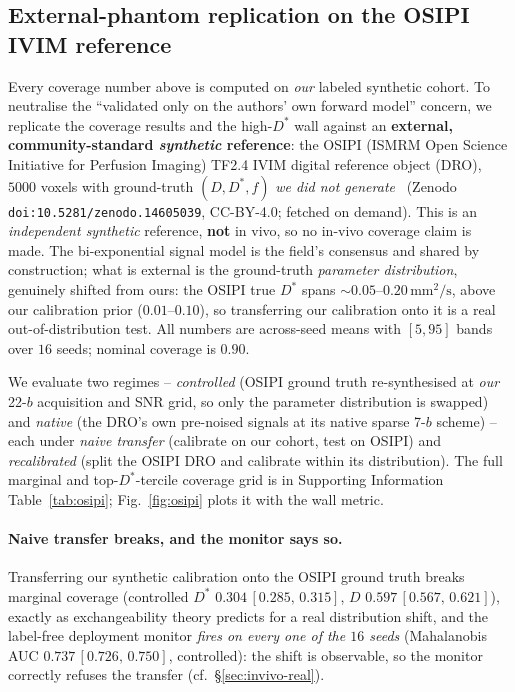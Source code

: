 \documentclass[11pt]{article}
\newcommand{\Dstar}{D^{*}}
\newcommand{\band}[2]{{\scriptsize\,$[#1,\,#2]$}}
\begin{document}
\subsection{External-phantom replication on the OSIPI IVIM reference}
\label{sec:osipi}
Every coverage number above is computed on \emph{our} labeled synthetic cohort. To
neutralise the ``validated only on the authors' own forward model'' concern, we
replicate the coverage results and the high-$\Dstar$ wall against an \textbf{external,
community-standard \emph{synthetic} reference}: the OSIPI (ISMRM Open Science
Initiative for Perfusion Imaging) TF2.4 IVIM digital reference object (DRO), $5000$
voxels with ground-truth $(D,\Dstar,f)$ \emph{we did not generate}~\citep{osipi_ivim}
(Zenodo \texttt{doi:10.5281/zenodo.14605039}, CC-BY-4.0; fetched on demand). This is
an \emph{independent synthetic} reference, \textbf{not} in vivo, so no in-vivo
coverage claim is made. The bi-exponential signal model is the field's consensus and
shared by construction; what is external is the ground-truth \emph{parameter
distribution}, genuinely shifted from ours: the OSIPI true $\Dstar$ spans
$\sim\!0.05$--$0.20\,\mathrm{mm^2/s}$, above our calibration prior ($0.01$--$0.10$),
so transferring our calibration onto it is a real out-of-distribution test. All
numbers are across-seed means with $[5,95]$ bands over $16$ seeds; nominal coverage
is $0.90$.

We evaluate two regimes -- \emph{controlled} (OSIPI ground truth re-synthesised at
\emph{our} 22-$b$ acquisition and SNR grid, so only the parameter distribution is
swapped) and \emph{native} (the DRO's own pre-noised signals at its native sparse
7-$b$ scheme) -- each under \emph{naive transfer} (calibrate on our cohort, test on
OSIPI) and \emph{recalibrated} (split the OSIPI DRO and calibrate within its
distribution). The full marginal and top-$\Dstar$-tercile coverage grid is in
Supporting Information Table~\ref{tab:osipi}; Fig.~\ref{fig:osipi} plots it with the
wall metric.

\paragraph{Naive transfer breaks, and the monitor says so.} Transferring our
synthetic calibration onto the OSIPI ground truth breaks marginal coverage
(controlled $\Dstar$ $0.304$\band{0.285}{0.315}, $D$ $0.597$\band{0.567}{0.621}),
exactly as exchangeability theory predicts for a real distribution shift, and the
label-free deployment monitor \emph{fires on every one of the $16$ seeds}
(Mahalanobis AUC $0.737$\band{0.726}{0.750}, controlled): the shift is observable, so
the monitor correctly refuses the transfer (cf.\ \S\ref{sec:invivo-real}).
\end{document}
